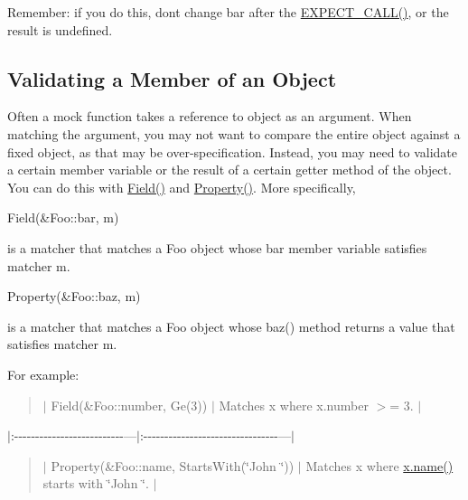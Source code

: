 Remember\+: if you do this, don\textquotesingle{}t change {\ttfamily bar} after the {\ttfamily \hyperlink{gmock-spec-builders_8h_a535a6156de72c1a2e25a127e38ee5232}{E\+X\+P\+E\+C\+T\+\_\+\+C\+A\+L\+L()}}, or the result is undefined.

\subsection*{Validating a Member of an Object}

Often a mock function takes a reference to object as an argument. When matching the argument, you may not want to compare the entire object against a fixed object, as that may be over-\/specification. Instead, you may need to validate a certain member variable or the result of a certain getter method of the object. You can do this with {\ttfamily \hyperlink{namespacetesting_a4df3849391696aa93ac3a7703a717c2a}{Field()}} and {\ttfamily \hyperlink{namespacetesting_a0fad10571e23f7bc0d5c83d4c31ba740}{Property()}}. More specifically,


\begin{DoxyCode}
Field(&Foo::bar, m)
\end{DoxyCode}


is a matcher that matches a {\ttfamily Foo} object whose {\ttfamily bar} member variable satisfies matcher {\ttfamily m}.


\begin{DoxyCode}
Property(&Foo::baz, m)
\end{DoxyCode}


is a matcher that matches a {\ttfamily Foo} object whose {\ttfamily baz()} method returns a value that satisfies matcher {\ttfamily m}.

For example\+:

\begin{quote}
$\vert$ {\ttfamily Field(\&\+Foo\+::number, Ge(3))} $\vert$ Matches {\ttfamily x} where {\ttfamily x.\+number $>$= 3}. $\vert$ \end{quote}
$\vert$\+:-\/-\/-\/-\/-\/-\/-\/-\/-\/-\/-\/-\/-\/-\/-\/-\/-\/-\/-\/-\/-\/-\/-\/-\/-\/-\/---$\vert$\+:-\/-\/-\/-\/-\/-\/-\/-\/-\/-\/-\/-\/-\/-\/-\/-\/-\/-\/-\/-\/-\/-\/-\/-\/-\/-\/-\/-\/-\/-\/-\/-\/---$\vert$ \begin{quote}
$\vert$ {\ttfamily Property(\&Foo\+::name, Starts\+With(\char`\"{}\+John \char`\"{}))} $\vert$ Matches {\ttfamily x} where {\ttfamily \hyperlink{namespaceinteractive__marker_a447655961b3d3ca3c5a2a9d3d769436d}{x.\+name()}} starts with {\ttfamily \char`\"{}\+John \char`\"{}}. $\vert$ \end{quote}


